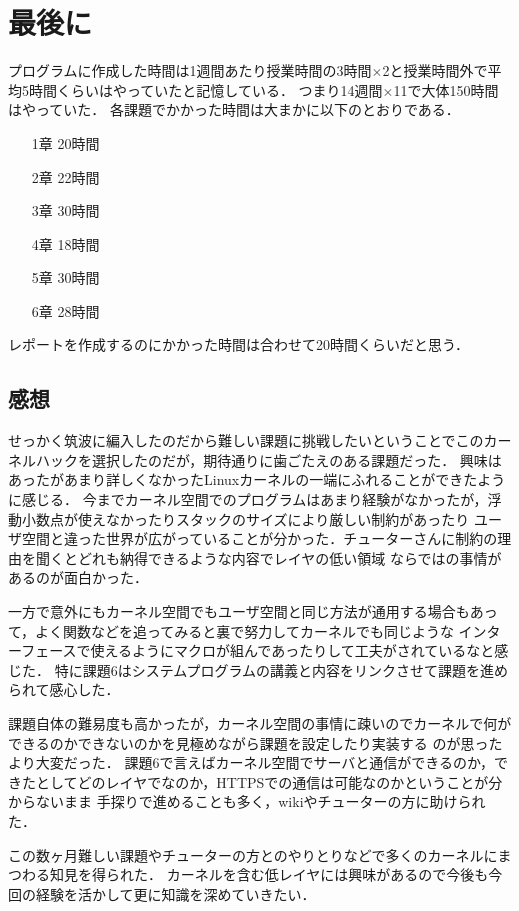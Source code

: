 \chapter{最後に}
プログラムに作成した時間は1週間あたり授業時間の3時間$\times$2と授業時間外で平均5時間くらいはやっていたと記憶している．
つまり14週間$\times$11で大体150時間はやっていた．
各課題でかかった時間は大まかに以下のとおりである．

\begin{itemize}
    \item[1章] 20時間
    \item[2章] 22時間
    \item[3章] 30時間
    \item[4章] 18時間
    \item[5章] 30時間
    \item[6章] 28時間
\end{itemize}

レポートを作成するのにかかった時間は合わせて20時間くらいだと思う．

\section{感想}
せっかく筑波に編入したのだから難しい課題に挑戦したいということでこのカーネルハックを選択したのだが，期待通りに歯ごたえのある課題だった．
興味はあったがあまり詳しくなかったLinuxカーネルの一端にふれることができたように感じる．
今までカーネル空間でのプログラムはあまり経験がなかったが，浮動小数点が使えなかったりスタックのサイズにより厳しい制約があったり
ユーザ空間と違った世界が広がっていることが分かった．チューターさんに制約の理由を聞くとどれも納得できるような内容でレイヤの低い領域
ならではの事情があるのが面白かった．

一方で意外にもカーネル空間でもユーザ空間と同じ方法が通用する場合もあって，よく関数などを追ってみると裏で努力してカーネルでも同じような
インターフェースで使えるようにマクロが組んであったりして工夫がされているなと感じた．
特に課題6はシステムプログラムの講義と内容をリンクさせて課題を進められて感心した．

課題自体の難易度も高かったが，カーネル空間の事情に疎いのでカーネルで何ができるのかできないのかを見極めながら課題を設定したり実装する
のが思ったより大変だった．
課題6で言えばカーネル空間でサーバと通信ができるのか，できたとしてどのレイヤでなのか，HTTPSでの通信は可能なのかということが分からないまま
手探りで進めることも多く，wikiやチューターの方に助けられた．

この数ヶ月難しい課題やチューターの方とのやりとりなどで多くのカーネルにまつわる知見を得られた．
カーネルを含む低レイヤには興味があるので今後も今回の経験を活かして更に知識を深めていきたい．
